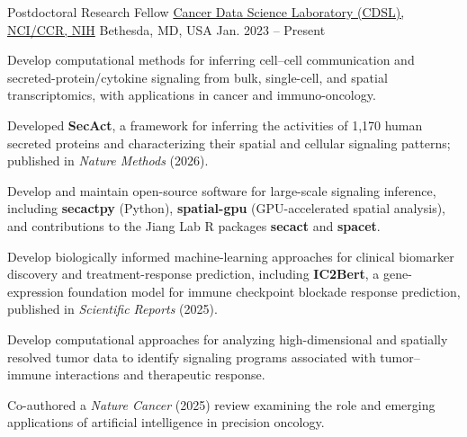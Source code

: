 

\begin{cventries}
\cventry
{Postdoctoral Research Fellow} %
{\href{https://ccr.cancer.gov/staff-directory/peng-jiang}{Cancer Data Science Laboratory (CDSL), NCI/CCR, NIH}} %
{Bethesda, MD, USA} %
{Jan. 2023 -- Present} %
{
	\begin{cvitems} %
		\item {Develop computational methods for inferring cell--cell communication and secreted-protein/cytokine signaling from bulk, single-cell, and spatial transcriptomics, with applications in cancer and immuno-oncology.}
		\item {Developed \textbf{SecAct}, a framework for inferring the activities of 1,170 human secreted proteins and characterizing their spatial and cellular signaling patterns; published in \textit{Nature Methods} (2026).}
		\item {Develop and maintain open-source software for large-scale signaling inference, including \textbf{secactpy} (Python), \textbf{spatial-gpu} (GPU-accelerated spatial analysis), and contributions to the Jiang Lab R packages \textbf{secact} and \textbf{spacet}.}
		\item {Develop biologically informed machine-learning approaches for clinical biomarker discovery and treatment-response prediction, including \textbf{IC2Bert}, a gene-expression foundation model for immune checkpoint blockade response prediction, published in \textit{Scientific Reports} (2025).}
		\item {Develop computational approaches for analyzing high-dimensional and spatially resolved tumor data to identify signaling programs associated with tumor--immune interactions and therapeutic response.}
		\item {Co-authored a \textit{Nature Cancer} (2025) review examining the role and emerging applications of artificial intelligence in precision oncology.}
	\end{cvitems}
}


\end{cventries}
